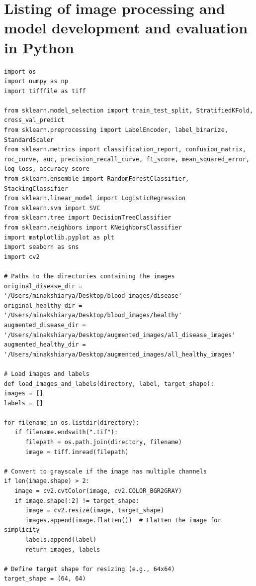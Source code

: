 \documentclass[phd]{ndsu-thesis-2022}
\begin{document}
\vspace{-3ex}
\section*{Listing of image processing and model development and evaluation in Python}
\vspace{1ex}
{\onehalfspacing
\begin{lstlisting}[caption={},
xleftmargin=5.5pt,xrightmargin=3pt,
frame=trBL, 
backgroundcolor=\color{black!10!white}]
import os
import numpy as np
import tifffile as tiff

from sklearn.model_selection import train_test_split, StratifiedKFold, cross_val_predict
from sklearn.preprocessing import LabelEncoder, label_binarize, StandardScaler
from sklearn.metrics import classification_report, confusion_matrix, roc_curve, auc, precision_recall_curve, f1_score, mean_squared_error, log_loss, accuracy_score
from sklearn.ensemble import RandomForestClassifier, StackingClassifier
from sklearn.linear_model import LogisticRegression
from sklearn.svm import SVC
from sklearn.tree import DecisionTreeClassifier
from sklearn.neighbors import KNeighborsClassifier
import matplotlib.pyplot as plt
import seaborn as sns
import cv2

# Paths to the directories containing the images
original_disease_dir = '/Users/minakshiarya/Desktop/blood_images/disease'
original_healthy_dir = '/Users/minakshiarya/Desktop/blood_images/healthy'
augmented_disease_dir = '/Users/minakshiarya/Desktop/augmented_images/all_disease_images'
augmented_healthy_dir = '/Users/minakshiarya/Desktop/augmented_images/all_healthy_images'

# Load images and labels
def load_images_and_labels(directory, label, target_shape):
images = []
labels = []

for filename in os.listdir(directory):
   if filename.endswith(".tif"):
      filepath = os.path.join(directory, filename)
      image = tiff.imread(filepath)

# Convert to grayscale if the image has multiple channels
if len(image.shape) > 2:
   image = cv2.cvtColor(image, cv2.COLOR_BGR2GRAY)
   if image.shape[:2] != target_shape:
      image = cv2.resize(image, target_shape)
      images.append(image.flatten())  # Flatten the image for simplicity
      labels.append(label)
      return images, labels

# Define target shape for resizing (e.g., 64x64)
target_shape = (64, 64)


\end{lstlisting}}
\end{document}
